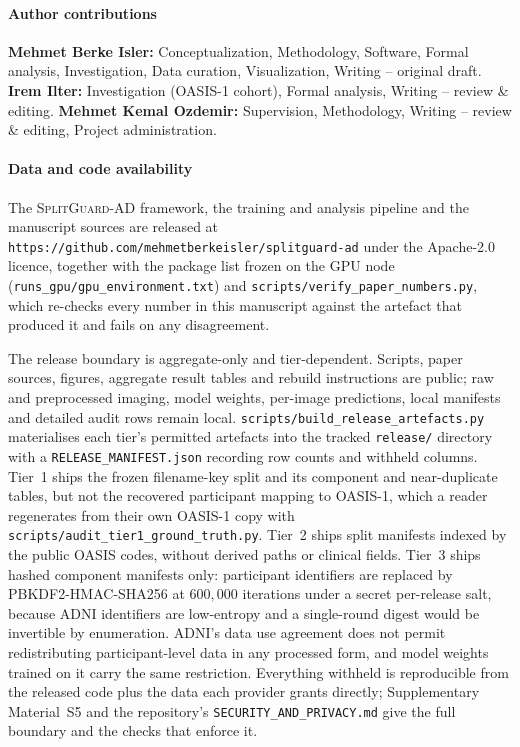 \documentclass[pdflatex,sn-vancouver-num]{sn-jnl}
\newcommand{\pb}{\discretionary{}{}{}}
\newcommand{\SGA}{\textsc{SplitGuard-AD}}
\begin{document}
\paragraph*{Author contributions}
\textbf{Mehmet Berke Isler:} Conceptualization, Methodology,
Software, Formal analysis, Investigation, Data curation,
Visualization, Writing -- original draft.
\textbf{Irem Ilter:} Investigation (OASIS-1 cohort), Formal analysis,
Writing -- review \& editing.
\textbf{Mehmet Kemal Ozdemir:} Supervision, Methodology,
Writing -- review \& editing, Project administration.

\paragraph*{Data and code availability}
The \SGA{} framework, the training and analysis pipeline and the manuscript
sources are released at
\texttt{https:/\pb /\pb github.com/\pb mehmetberkeisler/\pb splitguard-ad} under
the Apache-2.0 licence, together with the package list frozen on the GPU node
(\texttt{runs\_gpu/\pb gpu\_environment.txt}) and
\texttt{scripts/\pb verify\_paper\_numbers.py}, which re-checks every number in
this manuscript against the artefact that produced it and fails on any
disagreement.

The release boundary is aggregate-only and tier-dependent. Scripts, paper
sources, figures, aggregate result tables and rebuild instructions are public;
raw and preprocessed imaging, model weights, per-image predictions, local
manifests and detailed audit rows remain local.
\texttt{scripts/\pb build\_release\_artefacts.py} materialises each tier's
permitted artefacts into the tracked \texttt{release/} directory with a
\texttt{RELEASE\_MANIFEST.json} recording row counts and withheld columns.
Tier~1 ships the frozen filename-key split and its component and
near-duplicate tables, but not the recovered participant mapping to OASIS-1,
which a reader regenerates from their own OASIS-1 copy with
\texttt{scripts/\pb audit\_tier1\_ground\_truth.py}. Tier~2 ships split manifests
indexed by the public OASIS codes, without derived paths or clinical fields.
Tier~3 ships hashed component manifests only: participant identifiers are
replaced by PBKDF2-HMAC-SHA256 at $600{,}000$ iterations under a secret
per-release salt, because ADNI identifiers are low-entropy and a single-round
digest would be invertible by enumeration. ADNI's data use agreement does not
permit redistributing participant-level data in any processed form, and model
weights trained on it carry the same restriction. Everything withheld is
reproducible from the released code plus the data each provider grants
directly; Supplementary Material~S5 and the repository's
\texttt{SECURITY\_AND\_PRIVACY.md} give the full boundary and the checks that
enforce it.


\end{document}
